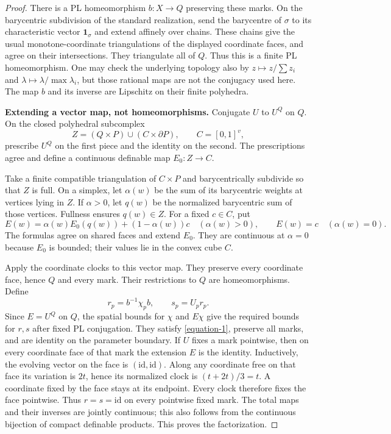 \documentclass[11pt,a4paper]{article}
\theoremstyle{definition}
\begin{document}
\begin{proof}
There is a PL homeomorphism $b:X\to Q$ preserving these
marks. On the barycentric subdivision of the standard
realization, send the barycentre of $\sigma$ to its
characteristic vector $\mathbf1_\sigma$ and extend
affinely over chains. These chains give the usual
monotone-coordinate triangulations of the displayed
coordinate faces, and agree on their intersections.
They triangulate all of $Q$. Thus this is a finite
PL homeomorphism. One may check the underlying topology
also by $z\mapsto z/\sum z_i$ and
$\lambda\mapsto\lambda/\max\lambda_i$, but those rational
maps are not the conjugacy used here. The map $b$
and its inverse are Lipschitz on their finite polyhedra.

\textbf{Extending a vector map, not homeomorphisms.}\quad
Conjugate $U$ to $U^Q$ on $Q$. On the closed polyhedral
subcomplex
\[
 Z=(Q\times P)\cup(C\times\partial P),
 \qquad C=[0,1]^v,
\]
prescribe $U^Q$ on the first piece and the identity on the
second. The prescriptions agree and define a continuous
definable map $E_0:Z\to C$.

Take a finite compatible triangulation of $C\times P$ and
barycentrically subdivide so that $Z$ is full. On a simplex,
let $\alpha(w)$ be the sum of its barycentric weights at
vertices lying in $Z$. If $\alpha>0$, let $q(w)$ be the
normalized barycentric sum of those vertices. Fullness
ensures $q(w)\in Z$. For a fixed $c\in C$, put
\begin{equation}
 E(w)=\alpha(w)E_0(q(w))+(1-\alpha(w))c
      \quad(\alpha(w)>0),\qquad E(w)=c\quad(\alpha(w)=0).
 \label{equation-9}
\end{equation}
The formulas agree on shared faces and extend $E_0$.
They are continuous at $\alpha=0$ because $E_0$ is bounded;
their values lie in the convex cube $C$.

Apply the coordinate clocks to this vector map. They
preserve every coordinate face, hence $Q$ and every mark.
Their restrictions to $Q$ are homeomorphisms. Define
\begin{equation}
 r_p=b^{-1}\chi_pb,\qquad s_p=U_pr_p.
 \label{equation-10}
\end{equation}
Since $E=U^Q$ on $Q$, the spatial bounds for $\chi$ and
$E\chi$ give the required bounds for $r,s$ after fixed
PL conjugation. They satisfy \eqref{equation-1}, preserve all marks,
and are identity on the parameter boundary. If $U$ fixes a mark pointwise, then on every coordinate face of
that mark the extension $E$ is the identity.  Inductively, the evolving
vector on the face is $(\mathrm{id},\mathrm{id})$.  Along any coordinate
free on that face its variation is $2t$, hence its normalized clock is
$(t+2t)/3=t$.  A coordinate fixed by the face stays at its endpoint.
Every clock therefore fixes the face pointwise.  Thus $r=s=\mathrm{id}$
on every pointwise fixed mark.
The total maps and their inverses are jointly continuous;
this also follows from the continuous bijection of compact
definable products. This proves the factorization.

\end{proof}
\end{document}
